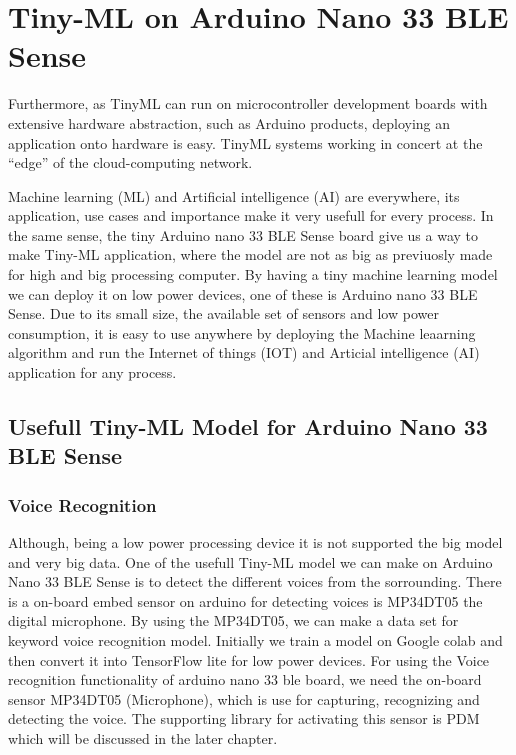 %
%
%

\chapter{Tiny-ML on Arduino Nano 33 BLE Sense}


Furthermore, as TinyML can run on microcontroller development boards with extensive hardware abstraction, such as Arduino products, deploying an application onto hardware is easy. TinyML systems working in concert at the “edge” of the cloud-computing network.\cite{Reddi:2021}

Machine learning (ML) and Artificial intelligence (AI) are everywhere, its application, use cases and importance make it very usefull for every process. In the same sense, the tiny Arduino nano 33 BLE Sense board give us a way to make Tiny-ML application, where the model are not as big as previuosly made for high and big processing computer. By having a tiny machine learning model we can deploy it on low power devices, one of these is Arduino nano 33 BLE Sense. Due to its small size, the available set of sensors and low power consumption, it is easy to use anywhere by deploying the Machine leaarning algorithm and run the Internet of things (IOT) and Articial intelligence (AI) application for any process.\cite{Dokic:2020}

\section{Usefull Tiny-ML Model for Arduino Nano 33 BLE Sense}

\subsection{Voice Recognition}

Although, being a low power processing device it is not supported the big model and very big data. One of the usefull Tiny-ML model we can make on Arduino Nano 33 BLE Sense is to detect the different voices from the sorrounding. There is a on-board embed sensor on arduino for detecting voices is MP34DT05 the digital microphone. By using the MP34DT05, we can make a data set for keyword voice recognition model. Initially we train a model on Google colab and then convert it into TensorFlow lite for low power devices.\cite{Waqar:2021} For using the Voice recognition functionality of arduino nano 33 ble board, we need the on-board sensor MP34DT05 (Microphone), which is use for capturing, recognizing and detecting the voice. The supporting library for activating this sensor is PDM which will be discussed in the later chapter.

